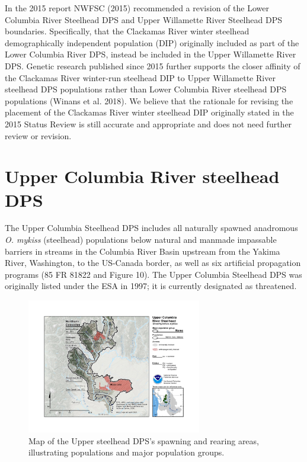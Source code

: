 \documentclass[
  letterpaper,
  oneside,
  open=any]{scrbook}
\begin{document}
In the 2015 report NWFSC (2015) recommended a revision of the Lower
Columbia River Steelhead DPS and Upper Willamette River Steelhead DPS
boundaries. Specifically, that the Clackamas River winter steelhead
demographically independent population (DIP) originally included as part
of the Lower Columbia River DPS, instead be included in the Upper
Willamette River DPS. Genetic research published since 2015 further
supports the closer affinity of the Clackamas River winter-run steelhead
DIP to Upper Willamette River steelhead DPS populations rather than
Lower Columbia River steelhead DPS populations (Winans et al. 2018). We
believe that the rationale for revising the placement of the Clackamas
River winter steelhead DIP originally stated in the 2015 Status Review
is still accurate and appropriate and does not need further review or
revision.


\hypertarget{upper-columbia-river-steelhead-dps}{%
\chapter{Upper Columbia River steelhead
DPS}\label{upper-columbia-river-steelhead-dps}}

The Upper Columbia Steelhead DPS includes all naturally spawned
anadromous \emph{O. mykiss} (steelhead) populations below natural and
manmade impassable barriers in streams in the Columbia River Basin
upstream from the Yakima River, Washington, to the US-Canada border, as
well as six artificial propagation programs (85 FR 81822 and Figure 10).
The Upper Columbia Steelhead DPS was originally listed under the ESA in
1997; it is currently designated as threatened.

\begin{figure}

{\centering \includegraphics[width=3in,height=\textheight]{content/Interior_Columbia/../../media/image14.jpg}

}

\caption{\label{fig-UCR-steelhead-spawning-areas}Map of the Upper
steelhead DPS's spawning and rearing areas, illustrating populations and
major population groups.}

\end{figure}
\end{document}
